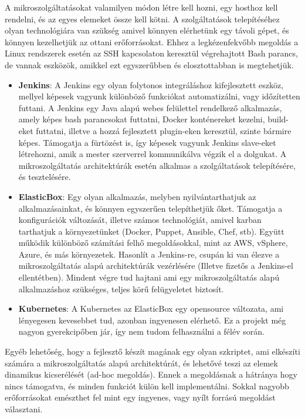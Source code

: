 \documentclass[11pt,magyar,a4paper,twoside,]{report}
\begin{document}
A mikroszolgáltatásokat valamilyen módon létre kell hozni, egy hosthoz
kell rendelni, és az egyes elemeket össze kell kötni. A szolgáltatások
telepítéséhez olyan technológiára van szükség amivel könnyen elérhetünk
egy távoli gépet, és könnyen kezelhetjük az ottani erőforrásokat. Ehhez
a legkézenfekvőbb megoldás a Linux rendszerek esetén az SSH kapcsolaton
keresztül végrehajtott Bash parancs, de vannak eszközök, amikkel ezt
egyszerűbben és elosztottabban is megtehetjük.

\begin{itemize}
\item
  \textbf{Jenkins}\citep{jenkins}: A Jenkins egy olyan folytonos
  integráláshoz kifejlesztett eszköz, mellyel képesek vagyunk különböző
  funkciókat automatizálni, vagy időzítetten futtani. A Jenkins egy Java
  alapú webes felülettel rendelkező alkalmazás, amely képes bash
  parancsokat futtatni, Docker konténereket kezelni, build-eket
  futtatni, illetve a hozzá fejlesztett plugin-eken keresztül, szinte
  bármire képes. Támogatja a fürtözést is, így képesek vagyunk Jenkins
  slave-eket létrehozni, amik a mester szerverrel kommunikálva végzik el
  a dolgukat. A mikroszolgáltatás architektúrák esetén alkalmas a
  szolgáltatások telepítésére, és tesztelésére.
\item
  \textbf{ElasticBox}\citep{elasticbox}: Egy olyan alkalmazás, melyben
  nyilvántarthatjuk az alkalmazásainkat, és könnyen egyszerűen
  telepíthetjük őket. Támogatja a konfigurációk változását, illetve
  számos technológiát, amivel karban tarthatjuk a környezetünket
  (Docker, Puppet, Ansible, Chef, stb). Együtt működik különböző
  számítási felhő megoldásokkal, mint az AWS, vSphere, Azure, és más
  környezetek. Hasonlít a Jenkins-re, csupán ki van élezve a
  mikroszolgáltatás alapú architektúrák vezérlésére (Illetve fizetős a
  Jenkins-el ellentétben). Mindent végre tud hajtani ami egy
  mikroszolgáltatás alapú alkalmazáshoz szükséges, teljes körű
  felügyeletet biztosít. \citep{jenkins-elasticbox}
\item
  \textbf{Kubernetes}\citep{kubernetes}: A Kubernetes az ElasticBox egy
  opensource változata, ami lényegesen kevesebbet tud, azonban
  ingyenesen elérhető. Ez a projekt még nagyon gyerekcipőben jár, így
  nem tudom felhasználni a félév során.
\end{itemize}

Egyéb lehetőség, hogy a fejlesztő készít magának egy olyan szkriptet,
ami elkészíti számára a mikroszolgáltatás alapú architektúrát, és
lehetővé teszi az elemek dinamikus kicserélését (ad-hoc megoldás). Ennek
a megoldásnak a hátránya hogy nincs támogatva, és minden funkciót külön
kell implementálni. Sokkal nagyobb erőforrásokat emészthet fel mint egy
ingyenes, vagy nyílt forrású megoldást választani.
\end{document}
